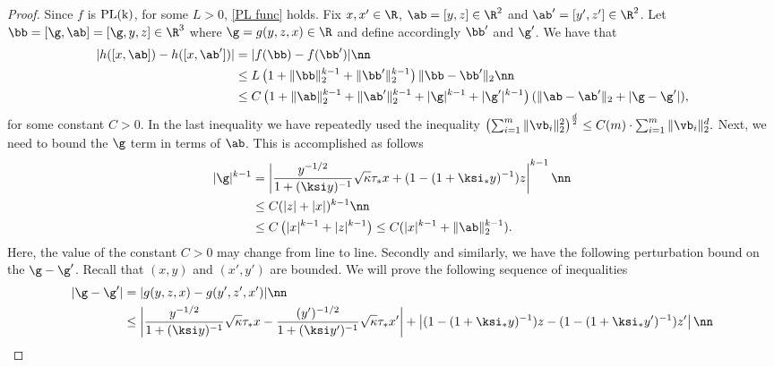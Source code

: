 \begin{proof}
Since $f$ is $\rm{PL}(k)$, for some $L>0$, \eqref{PL func} holds. Fix $x,x'\in\R$, $\ab=[y,z]\in\R^{2}$ and $\ab'=[y',z']\in\R^{2}$. Let $\bb=[\g,\ab]=[\g,y,z]\in\R^3$ where $\g=g(y,z,x)\in\R$ and define accordingly $\bb'$ and $\g'$. We have that
\begin{align}
|h([x,\ab])-h([x,\ab'])|&= |f(\bb)-f(\bb')|\nn\\
&\leq L\left(1+\|\bb\|_2^{k-1}+\|\bb'\|_2^{k-1}\right)\|\bb-\bb'\|_2\nn\\
&\leq C\left(1+\|\ab\|_2^{k-1}+\|\ab'\|_2^{k-1}+|\g|^{k-1}+|\g'|^{k-1}\right)(\|\ab-\ab'\|_2+|\g-\g'|),\label{eq:hlip}
\end{align}
for some constant $C>0$. In the last inequality we have repeatedly used the inequality
$
\left(\sum_{i=1}^m \|\vb_i\|_2^2\right)^{\frac{d}{2}} \leq  C(m)\cdot\sum_{i=1}^m\|\vb_i\|_2^{d}.
$
Next, we need to bound the $\g$ term in terms of $\ab$. This is accomplished as follows
\begin{align}
|\g|^{k-1} &= \left|\frac{y^{-1/2}}{1+(\ksi y)^{-1}}\sqrt{\kappa}\tau_* x + (1-(1+\ksi_*y)^{-1})z\right|^{k-1}\nn\\
&\leq C (|z|+|x|)^{k-1} \nn\\
&\leq C \left(|x|^{k-1}+|z|^{k-1}\right) \leq C (|x|^{k-1} + \|\ab\|_2^{k-1}).\label{eq:gb}
\end{align}
Here, the value of the constant $C>0$ may change from line to line. 
Secondly and similarly, we have the following perturbation bound on the $\g-\g'$. Recall that $(x,y)$ and $(x',y')$ are bounded. We will prove the following sequence of inequalities
\begin{align}
|{\g-\g'}|&= |g(y,z,x)-g(y',z',x')| \nn\\
&\leq \left|\frac{y^{-1/2}}{1+(\ksi y)^{-1}}\sqrt{\kappa}\tau_* x - \frac{(y')^{-1/2}}{1+(\ksi y')^{-1}}\sqrt{\kappa}\tau_* x'\right|
 + \left|(1-(1+\ksi_*y)^{-1})z-(1-(1+\ksi_*y')^{-1})z'\right|\nn\\

\end{align}
\end{proof}
